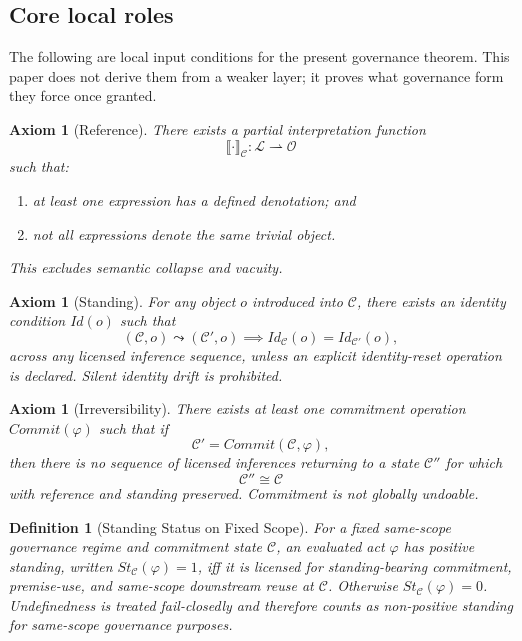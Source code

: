 \documentclass[11pt]{article}
\newtheorem{definition}[theorem]{Definition}
\newtheorem{axiom}[theorem]{Axiom}
\begin{document}
\subsection{Core local roles}

The following are local input conditions for the present governance theorem. This paper does not derive them from a weaker layer; it proves what governance form they force once granted.

\begin{axiom}[Reference]
There exists a partial interpretation function
\[
\llbracket \cdot \rrbracket_{\mathcal{C}} : \mathcal{L} \rightharpoonup \mathcal{O}
\]
such that:
\begin{enumerate}
\item at least one expression has a defined denotation; and
\item not all expressions denote the same trivial object.
\end{enumerate}
This excludes semantic collapse and vacuity.
\end{axiom}

\begin{axiom}[Standing]
For any object $o$ introduced into $\mathcal{C}$, there exists an identity condition $Id(o)$ such that
\[
(\mathcal{C},o) \leadsto (\mathcal{C}',o) \implies Id_{\mathcal{C}}(o)=Id_{\mathcal{C}'}(o),
\]
across any licensed inference sequence, unless an explicit identity-reset operation is declared. Silent identity drift is prohibited.
\end{axiom}

\begin{axiom}[Irreversibility]
There exists at least one commitment operation $Commit(\varphi)$ such that if
\[
\mathcal{C}' = Commit(\mathcal{C},\varphi),
\]
then there is no sequence of licensed inferences returning to a state $\mathcal{C}''$ for which
\[
\mathcal{C}'' \cong \mathcal{C}
\]
with reference and standing preserved. Commitment is not globally undoable.
\end{axiom}

\begin{definition}[Standing Status on Fixed Scope]
\label{def:standingstatus}
For a fixed same-scope governance regime and commitment state $\mathcal{C}$, an evaluated act $\varphi$ has positive standing, written $St_{\mathcal{C}}(\varphi)=1$, iff it is licensed for standing-bearing commitment, premise-use, and same-scope downstream reuse at $\mathcal{C}$. Otherwise $St_{\mathcal{C}}(\varphi)=0$. Undefinedness is treated fail-closedly and therefore counts as non-positive standing for same-scope governance purposes.
\end{definition}
\end{document}
